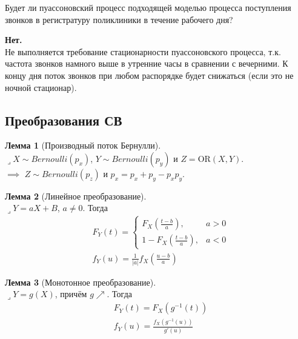 \documentclass[a4paper,12pt,fleqn]{article}
\newenvironment{onsamepage} {\begin{minipage}{\textwidth}} {\end{minipage}}
\numberwithin{figure}{section}
\theoremstyle{definition}
\newtheorem{lemma}{Лемма}[section]
\def\lets{{\huge$\lrcorner$}\space}
\begin{document}
\begin{onsamepage}
\begin{problem}
	Будет ли пуассоновский процесс подходящей моделью процесса поступления
	звонков в регистратуру поликлиники в течение рабочего дня?
\end{problem}
\begin{solution}
  \textbf{Нет.}\\
	Не выполняется требование стационарности пуассоновского процесса, т.к.
	частота звонков намного выше в утренние часы в сравнении с вечерними.
	К концу дня поток звонков при любом распорядке будет снижаться
	(если это не ночной стационар).
\end{solution}
\end{onsamepage}


\subsection{Преобразования СВ}

\begin{lemma}[Производный поток Бернулли] ~\\
	\lets $X \sim Bernoulli(p_x)$, $Y \sim Bernoulli(p_y)$ и $Z = \mathrm{OR}(X,Y)$. \\
	$\implies$ $Z \sim Bernoulli(p_z)$ и $p_x = p_x + p_y - p_x p_y$.
\end{lemma}

\begin{lemma}[Линейное преобразование] ~\\
	\lets $Y=aX+B$, $a\ne 0$. Тогда
	\begin{align*}
	&	F_Y(t) = \begin{cases*}
					F_X \left( \frac{t-b}{a} \right),		& a>0 \\
					1 - F_X \left( \frac{t-b}{a} \right),	& a<0
				 \end{cases*} \\
	&	f_Y(u) = \frac{1}{|a|} f_X \left( \frac{u-b}{a} \right)
	\end{align*}
\end{lemma}

\begin{lemma}[Монотонное преобразование] ~\\
	\lets $Y=g(X)$, причём $g \nearrow$. Тогда
	\begin{align*}
	&	F_Y(t) = F_X \left( g^{-1}(t) \right)	\\
	&	f_Y(u) = \frac{ f_X \left( g^{-1}(u) \right) }{ g'(u) }
	\end{align*}
\end{lemma}
\end{document}
